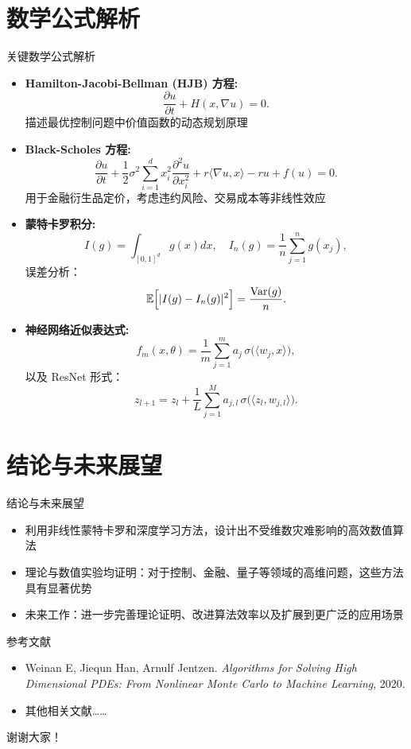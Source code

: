 \documentclass[aspectratio=169]{beamer}
\begin{document}
	\section{数学公式解析}
	\begin{frame}{关键数学公式解析}
		\begin{itemize}
			\item \textbf{Hamilton-Jacobi-Bellman (HJB) 方程:}
				\begin{equation*}
				\frac{\partial u}{\partial t}+H(x,\nabla u)=0.
				\end{equation*}
				描述最优控制问题中价值函数的动态规划原理
			\item \textbf{Black-Scholes 方程:}
				\begin{equation*}
				\frac{\partial u}{\partial t}+\frac{1}{2}\sigma^2 \sum_{i=1}^{d}x_i^2 \frac{\partial^2 u}{\partial x_i^2}+r\langle \nabla u,x\rangle-ru+f(u)=0.
				\end{equation*}
				用于金融衍生品定价，考虑违约风险、交易成本等非线性效应
			\item \textbf{蒙特卡罗积分:}
				\begin{equation*}
				I(g)=\int_{[0,1]^d}g(x)dx,\quad I_n(g)=\frac{1}{n}\sum_{j=1}^n g(x_j),
				\end{equation*}
				误差分析：
				\begin{equation*}
				\mathbb{E}\Bigl[|I(g)-I_n(g)|^2\Bigr]=\frac{\mathrm{Var}(g)}{n}.
				\end{equation*}
			\item \textbf{神经网络近似表达式:}
				\begin{equation*}
				f_m(x,\theta)=\frac{1}{m}\sum_{j=1}^{m}a_j\,\sigma\bigl(\langle w_j,x\rangle\bigr),
				\end{equation*}
				以及 ResNet 形式：
				\begin{equation*}
				z_{l+1}=z_l+\frac{1}{L}\sum_{j=1}^{M}a_{j,l}\,\sigma\bigl(\langle z_l,w_{j,l}\rangle\bigr).
				\end{equation*}
		\end{itemize}
	\end{frame}
	\fi

	\section{结论与未来展望}
	\begin{frame}{结论与未来展望}
		\begin{itemize}
			\item 利用非线性蒙特卡罗和深度学习方法，设计出不受维数灾难影响的高效数值算法
			\item 理论与数值实验均证明：对于控制、金融、量子等领域的高维问题，这些方法具有显著优势
			\item 未来工作：进一步完善理论证明、改进算法效率以及扩展到更广泛的应用场景
		\end{itemize}
	\end{frame}

	\begin{frame}{参考文献}
		\begin{itemize}
			\item Weinan E, Jiequn Han, Arnulf Jentzen. \emph{Algorithms for Solving High Dimensional PDEs: From Nonlinear Monte Carlo to Machine Learning}, 2020.
			\item 其他相关文献……
		\end{itemize}
	\end{frame}

	\begin{frame}
		\centering \Large 谢谢大家！
	\end{frame}
\end{document}
